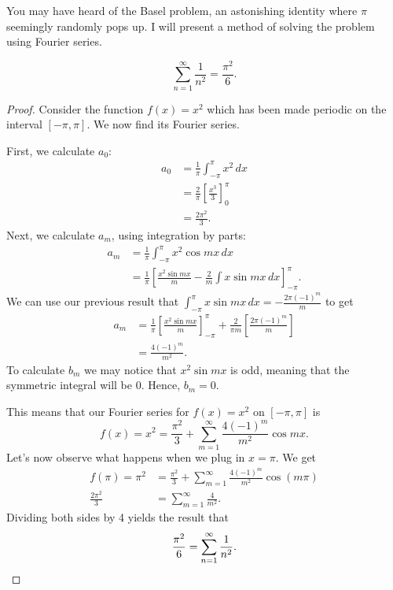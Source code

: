 \documentclass{amsart}
\begin{document}
  You may have heard of the Basel problem, an astonishing identity where $\pi$ seemingly randomly pops up. I will present a method of solving the problem using Fourier series.
  \begin{theorem}
    \[
      \sum_{n = 1}^{\infty} \frac{1}{n^2} = \frac{\pi^2}{6}
    .\] 
  \end{theorem}
  \begin{proof}
    Consider the function $f(x) = x^2$ which has been made periodic on the interval $[-\pi, \pi]$. We now find its Fourier series.

    First, we calculate $a_0$:
    \begin{align*}
      a_0 &= \frac{1}{\pi} \int_{-\pi}^{\pi} x^2 \, dx \\
          &= \frac{2}{\pi}\left[ \frac{x^3}{3} \right]_{0}^{\pi} \\
          &= \frac{2\pi^2}{3}.
    \end{align*}
    Next, we calculate $a_m$, using integration by parts:
    \begin{align*}
      a_m &= \frac{1}{\pi} \int_{-\pi}^{\pi} x^2 \cos mx \, dx \\
          &= \frac{1}{\pi} \left[ \frac{x^2 \sin mx}{m} - \frac{2}{m} \int x \sin mx \, dx \right]_{-\pi}^{\pi} .
    \end{align*}
    We can use our previous result that $\int_{-\pi}^{\pi} x \sin mx \, dx = -\frac{2\pi(-1)^{m}}{m}$ to get
    \begin{align*}
      a_m &= \frac{1}{\pi} \left[ \frac{x^2 \sin mx}{m} \right]_{-\pi}^{\pi} + \frac{2}{\pi m}\left[ \frac{2\pi(-1)^{m}}{m} \right] \\
          &= \frac{4(-1)^{m}}{m^{2}}.
    \end{align*}
    To calculate $b_m$ we may notice that $x^2 \sin mx$ is odd, meaning that the symmetric integral will be 0. Hence, $b_m = 0$.

    This means that our Fourier series for $f(x) = x^2$ on $[-\pi, \pi]$ is \[
      f(x) = x^2 = \frac{\pi^2}{3} + \sum_{m=1}^{\infty} \frac{4(-1)^{m}}{m^2} \cos mx
    .\] 
  Let's now observe what happens when we plug in $x = \pi$. We get 
  \begin{align*}
    f(\pi) = \pi^2 &= \frac{\pi^2}{3} + \sum_{m=1}^{\infty} \frac{4(-1)^{m}}{m^2}\cos(m \pi) \\
    \frac{2\pi^2}{3} &= \sum_{m=1}^{\infty} \frac{4}{m^2} .
  \end{align*}
  Dividing both sides by 4 yields the result that \[
    \frac{\pi^2}{6} = \sum_{n=1}^{\infty} \frac{1}{n^2}. \qedhere
  \] 
\end{proof}
\end{document}
